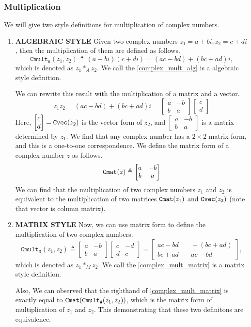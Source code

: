 \documentclass[runningheads]{llncs}
\newcommand{\bmatL}{\begin{bmatrix}}
\newcommand{\bmatR}{\end{bmatrix}}
\begin{document}
\subsubsection{Multiplication}
We will give two style definitions for multiplication of complex numbers.
\begin{enumerate}[(1)]
\item \textbf{ALGEBRAIC STYLE}
  Given two complex numbers $z_1=a+bi, z_2=c+di$, then the multiplication of them are defined as follows.
  \begin{equation}\label{complex_mult_alg}
    \mathtt{Cmult_A}(z_1,z_2)\triangleq (a+bi)(c+di)=(ac-bd)+(bc+ad)i,
  \end{equation}
  which is denoted as $z_1 *_A z_2$.
  We call the \eqref{complex_mult_alg} is a algebraic style definition.

  We can rewrite this result with the multiplication of a matrix and a vector.
  \begin{equation}
    z_1z_2=(ac-bd)+(bc+ad)i=\bmatL a&-b\\b&a\bmatR \bmatL c\\d\bmatR 
  \end{equation}
  Here, $\bmatL c\\d\bmatR =\Cvec{z_2}$ is the vector form of $z_2$, and $\bmatL a&-b\\b&a\bmatR $ is a matrix determined by $z_1$.
  We find that any complex number has a $2\times 2$ matrix form, and this is a one-to-one correspondence.
  We define the matrix form of a complex number $z$ as follows.
  \begin{equation}
    \Cmat{z}\triangleq \bmatL a&-b\\b&a\bmatR 
  \end{equation}
  We can find that the multiplication of two complex numbers $z_1$ and $z_2$ is equivalent to the multiplication of two matrices $\Cmat{z_1}$ and $\Cvec{z_2}$ (note that vector is column matrix).
\item \textbf{MATRIX STYLE}
  Now, we can use matrix form to define the multiplication of two complex numbers.
  \begin{equation}\label{complex_mult_matrix}
    \mathtt{Cmult_M}(z_1,z_2)\triangleq\bmatL a&-b\\b&a\bmatR \bmatL c&-d\\d&c\bmatR 
    =\bmatL ac-bd&\quad -(bc+ad)\\bc+ad&\quad ac-bd\bmatR ,
  \end{equation}
  which is denoted as $z_1 *_M z_2$.
  We call the \eqref{complex_mult_matrix} is a matrix style definition.
  
  Also, We can observed that the righthand of \eqref{complex_mult_matrix} is exactly equal to $\Cmat{\mathtt{Cmult_A}(z_1,z_2)}$, which is the matrix form of multiplication of $z_1$ and $z_2$.
  This demonstrating that these two definitons are equivalence.
\end{enumerate}
\end{document}
